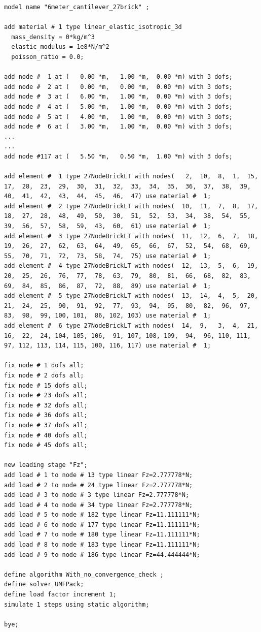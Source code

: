 %
\begin{lstlisting}
model name "6meter_cantilever_27brick" ;

add material # 1 type linear_elastic_isotropic_3d
  mass_density = 0*kg/m^3
  elastic_modulus = 1e8*N/m^2
  poisson_ratio = 0.0;

add node #  1 at (   0.00 *m,   1.00 *m,  0.00 *m) with 3 dofs;
add node #  2 at (   0.00 *m,   0.00 *m,  0.00 *m) with 3 dofs;
add node #  3 at (   6.00 *m,   1.00 *m,  0.00 *m) with 3 dofs;
add node #  4 at (   5.00 *m,   1.00 *m,  0.00 *m) with 3 dofs;
add node #  5 at (   4.00 *m,   1.00 *m,  0.00 *m) with 3 dofs;
add node #  6 at (   3.00 *m,   1.00 *m,  0.00 *m) with 3 dofs;
...
...
add node #117 at (   5.50 *m,   0.50 *m,  1.00 *m) with 3 dofs;

add element #  1 type 27NodeBrickLT with nodes(   2,  10,  8,  1,  15,  17,  28,  23,  29,  30,  31,  32,  33,  34,  35,  36,  37,  38,  39,  40,  41,  42,  43,  44,  45,  46,  47) use material #  1; 
add element #  2 type 27NodeBrickLT with nodes(  10,  11,  7,  8,  17,  18,  27,  28,  48,  49,  50,  30,  51,  52,  53,  34,  38,  54,  55,  39,  56,  57,  58,  59,  43,  60,  61) use material #  1; 
add element #  3 type 27NodeBrickLT with nodes(  11,  12,  6,  7,  18,  19,  26,  27,  62,  63,  64,  49,  65,  66,  67,  52,  54,  68,  69,  55,  70,  71,  72,  73,  58,  74,  75) use material #  1; 
add element #  4 type 27NodeBrickLT with nodes(  12,  13,  5,  6,  19,  20,  25,  26,  76,  77,  78,  63,  79,  80,  81,  66,  68,  82,  83,  69,  84,  85,  86,  87,  72,  88,  89) use material #  1; 
add element #  5 type 27NodeBrickLT with nodes(  13,  14,  4,  5,  20,  21,  24,  25,  90,  91,  92,  77,  93,  94,  95,  80,  82,  96,  97,  83,  98,  99, 100, 101,  86, 102, 103) use material #  1; 
add element #  6 type 27NodeBrickLT with nodes(  14,  9,   3,  4,  21,  16,  22,  24, 104, 105, 106,  91, 107, 108, 109,  94,  96, 110, 111,  97, 112, 113, 114, 115, 100, 116, 117) use material #  1; 

fix node # 1 dofs all;
fix node # 2 dofs all;
fix node # 15 dofs all;
fix node # 23 dofs all;
fix node # 32 dofs all;
fix node # 36 dofs all;
fix node # 37 dofs all;
fix node # 40 dofs all;
fix node # 45 dofs all;

new loading stage "Fz";
add load # 1 to node # 13 type linear Fz=2.777778*N; 
add load # 2 to node # 24 type linear Fz=2.777778*N; 
add load # 3 to node # 3 type linear Fz=2.777778*N; 
add load # 4 to node # 34 type linear Fz=2.777778*N; 
add load # 5 to node # 182 type linear Fz=11.111111*N; 
add load # 6 to node # 177 type linear Fz=11.111111*N; 
add load # 7 to node # 180 type linear Fz=11.111111*N; 
add load # 8 to node # 183 type linear Fz=11.111111*N; 
add load # 9 to node # 186 type linear Fz=44.444444*N; 

define algorithm With_no_convergence_check ;
define solver UMFPack;
define load factor increment 1;
simulate 1 steps using static algorithm;

bye;
\end{lstlisting}

